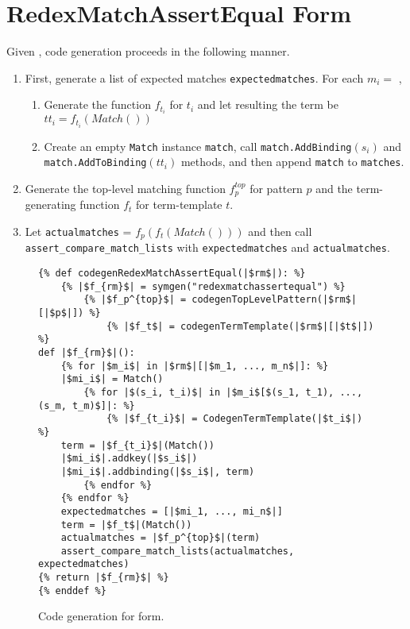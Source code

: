 \section{RedexMatchAssertEqual Form}
Given \RedexMatchAssertEqual, code generation proceeds in the following manner.

\begin{enumerate}
\item First, generate a list of expected matches \texttt{expectedmatches}. For each $m_i =$ \Match,
\begin{enumerate}
\item Generate the function $f_{t_i}$ for $t_i$ and let resulting the term be $tt_i = f_{t_i}(Match())$
\item Create an empty \texttt{Match} instance \texttt{match}, call \texttt{match.AddBinding}$(s_i)$ and \newline \texttt{match.AddToBinding}$(tt_i)$ methods, and then append \texttt{match} to \texttt{matches}.
\end{enumerate}
\item Generate the top-level matching function $f_p^{top}$ for pattern $p$ and the term-generating function $f_t$ for term-template $t$.
\item Let \texttt{actualmatches} = $f_p(f_t(Match()))$ and then call \texttt{assert\_compare\_match\_lists} with \texttt{expectedmatches} and \texttt{actualmatches}.
\end{enumerate}

\begin{figure}[h]
\begin{verbatim}
{% def codegenRedexMatchAssertEqual(|$rm$|): %}
	{% |$f_{rm}$| = symgen("redexmatchassertequal") %}
		{% |$f_p^{top}$| = codegenTopLevelPattern(|$rm$|[|$p$|]) %}
			{% |$f_t$| = codegenTermTemplate(|$rm$|[|$t$|]) %}
def |$f_{rm}$|():
	{% for |$m_i$| in |$rm$|[|$m_1, ..., m_n$|]: %}
	|$mi_i$| = Match()
		{% for |$(s_i, t_i)$| in |$m_i$[$(s_1, t_1), ..., (s_m, t_m)$]|: %}
			{% |$f_{t_i}$| = CodegenTermTemplate(|$t_i$|) %}
	term = |$f_{t_i}$|(Match())
	|$mi_i$|.addkey(|$s_i$|)
	|$mi_i$|.addbinding(|$s_i$|, term)
		{% endfor %}
	{% endfor %}
	expectedmatches = [|$mi_1, ..., mi_n$|]
	term = |$f_t$|(Match())
	actualmatches = |$f_p^{top}$|(term)
	assert_compare_match_lists(actualmatches, expectedmatches)
{% return |$f_{rm}$| %}
{% enddef %}
\end{verbatim}
\caption{Code generation for \RedexMatchAssertEqualNoArgs \space form.}
\label{codegen-redexmatch}
\end{figure}

